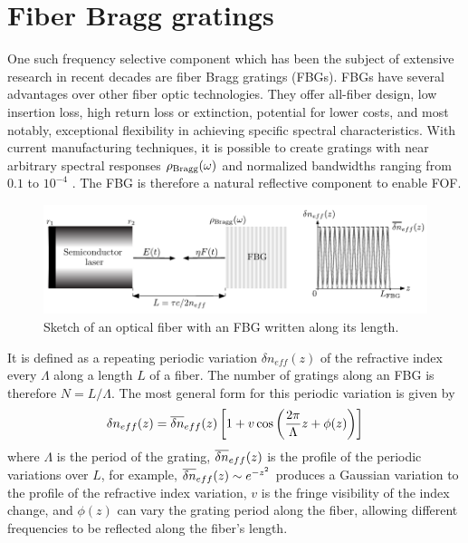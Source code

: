 \section*{Fiber Bragg gratings}
\label{sec:FBG}
%
One such frequency selective component which has been the subject of extensive research in recent decades are fiber Bragg gratings (FBGs). 
FBGs have several advantages over other fiber optic technologies. 
They offer all-fiber design, low insertion loss, high return loss or extinction,  potential for lower costs, and most notably, exceptional flexibility in achieving specific spectral characteristics. 
With current manufacturing techniques, it is possible to create gratings with near arbitrary spectral responses $\rho_\text{Bragg}(\omega)$ and normalized bandwidths ranging from $0.1$ to $10^{-4}$ \cite{erdogan1997fiber}. 
The FBG is therefore a natural reflective component to enable FOF.
%
\begin{figure}
    \centering 

    \includegraphics[width=\textwidth]{Images/Introduction/FBG_setup_dneff.pdf}

    \caption{Sketch of an optical fiber with an FBG written along its length.}

    \label{fig:FBG_setup}

\end{figure}
%
\par
%
It is defined as a repeating periodic variation $\delta n_{eff}(z)$ of the refractive index every $\Lambda$ along a length $L$ of a fiber. 
The number of gratings along an FBG is therefore $N = L/\Lambda$. The most general form for this periodic variation is given by
%
\begin{equation}
\label{eq:dneff}
    \delta n_{eff}(z) = \overline{\delta n}_{eff}(z) \left[ 1 + v \cos{\left( \frac{2 \pi}{\Lambda} z + \phi(z) \right)} \right]
\end{equation}
%
where $\Lambda$ is the period of the grating, $\overline{\delta n}_{eff}(z)$ is the profile of the periodic variations over $L$, for example, $\overline{\delta n}_{eff}(z) \sim e^{-z^2}$ produces a Gaussian variation to the profile of the refractive index variation, 
$v$ is the fringe visibility of the index change, and $\phi(z)$ can vary the grating period along the fiber, allowing different frequencies to be reflected along the fiber's length.
